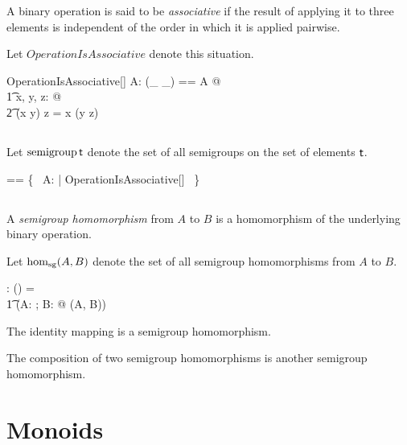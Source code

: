 \documentclass[11pt, oneside]{article}
\begin{document}
A binary operation is said to be {\em associative} if the result of applying it to three elements
is independent of the order in which it is applied pairwise.

Let $OperationIsAssociative$ denote this situation.

\begin{schema}{OperationIsAssociative}[\genT]
A: \binop \genT
\where
\LET (\_ \mulG \_) == A @ \\
\t1	\forall x, y, z: \genT @ \\
\t2		(x \mulG y) \mulG z = x \mulG (y \mulG z)
\end{schema}

\subsection{}

Let $\operatorname{semigroup} \mathsf{t}$ denote the set of all semigroups on the set of elements $\mathsf{t}$.

\begin{zed}
\semigroup \genT == \{~ A: \binop \genT | OperationIsAssociative[\genT] ~\}
\end{zed}

\subsection{}

A {\em semigroup homomorphism} from $A$ to $B$ is a homomorphism of the underlying binary operation.

Let $\operatorname{hom_{sg}}(A, B)$ denote the set of all semigroup homomorphisms from $A$ to $B$.

\begin{gendef}[\genT, \genU]
\homSemigroup: \semigroup \genT \cross \semigroup \genU \fun \power (\genT \pfun \genU)
\where
\homSemigroup = \\
\t1	(\lambda A: \semigroup \genT; B: \semigroup \genU @ \homBinOp(A, B))
\end{gendef}

\begin{remark}
The identity mapping is a semigroup homomorphism.
\end{remark}

\begin{remark}
The composition of two semigroup homomorphisms is another semigroup homomorphism.
\end{remark}

\section{Monoids}
\end{document}
